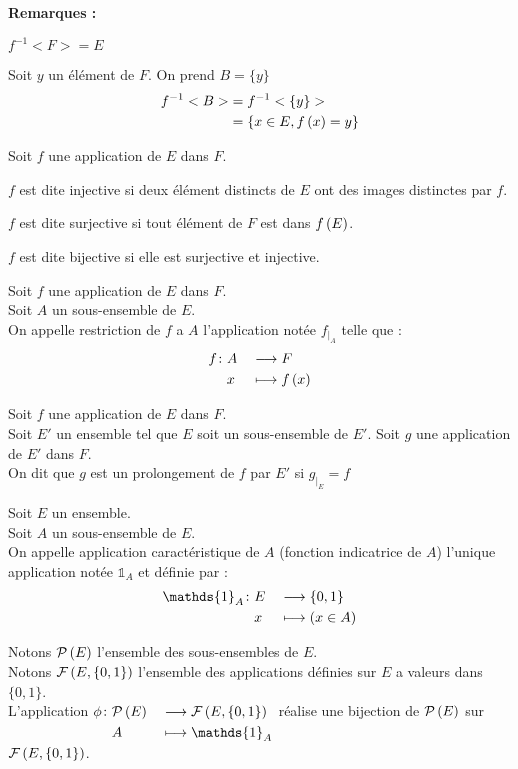 \documentclass[12pt,twoside,a4paper]{article}
\begin{document}
		\textbf{Remarques :}
		\begin{liste}
			\item $f^{-1}<F> = E$
			\item Soit $y$ un \'el\'ement de $F$. On prend $B=\{y\}$
				$$\begin{aligned}
					f^{-1}<B>&=f^{-1}<\{y\}>\\
							 &=\{x\in E, f\left(x\right)=y\}
				\end{aligned}$$
		\end{liste}
		\begin{defi}
			Soit $f$ une application de $E$ dans $F$.
			\begin{liste}
				\item $f$ est dite injective si deux \'el\'ement distincts de $E$ ont des images distinctes par $f$.
				\item $f$ est dite surjective si tout \'el\'ement de $F$ est dans $f\left(E\right)$.
				\item $f$ est dite bijective si elle est surjective et injective.
			\end{liste}
		\end{defi}
		\begin{defi}
			\begin{liste}
				\item Soit $f$ une application de $E$ dans $F$. \\
					Soit $A$ un sous-ensemble de $E$. \\
					On appelle restriction de $f$ a $A$ l'application not\'ee $f_{|_A}$ telle que :
					$$\begin{aligned}[t]f\colon&A&&\longrightarrow F \\&x&&\longmapsto f\left(x\right)\end{aligned}$$
				\item Soit $f$ une application de $E$ dans $F$. \\
					Soit $E'$ un ensemble tel que $E$ soit un sous-ensemble de $E'$.
					Soit $g$ une application de $E'$ dans $F$. \\
					On dit que $g$ est un prolongement de $f$ par $E'$ si $g_{|_E}=f$
			\end{liste}
		\end{defi}\newpage
		\begin{defi}
			Soit $E$ un ensemble. \\
			Soit $A$ un sous-ensemble de $E$. \\
			On appelle application caract\'eristique de $A$ (fonction indicatrice de $A$) l'unique application not\'ee $\mathds{1}_A$ et d\'efinie par :
			$$\fonction{\mathds{1}_A}{E}{\{0,1\}}{x}{\lf{x\in A}}$$
		\end{defi}
		\begin{prop}
			Notons $\mathcal{P}\left(E\right)$ l'ensemble des sous-ensembles de $E$. \\
			Notons $\mathcal{F}\left(E,\{0,1\}\right)$ l'ensemble des applications d\'efinies sur $E$ a valeurs dans $\{0,1\}$. \\
			L'application $\fonction{\phi}{\mathcal{P}\lf{E}}{\mathcal{F}\lf{E,\{0,1\}}}{A}{\mathds{1}_A}$ r\'ealise une bijection de $\mathcal{P}\left(E\right)$ sur $\mathcal{F}\left(E,\{0,1\}\right)$.
		\end{prop}
\end{document}
